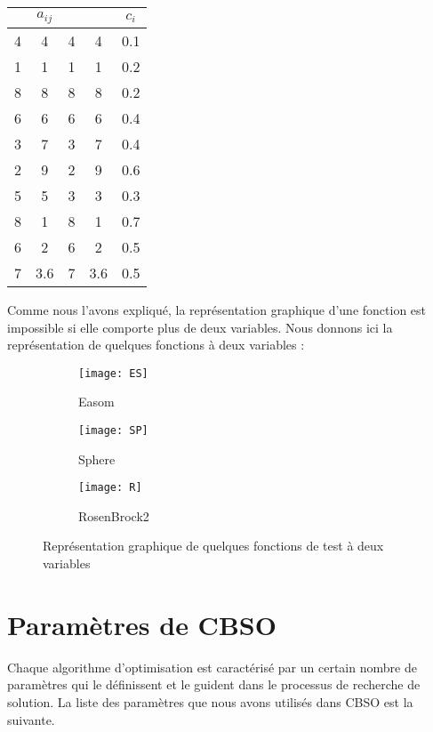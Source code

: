 \begin{itemize}
	\bigskip
	\bigskip
	
	\begin{table}[H]\centering
		\begin{tabular}{cccc|c}
			\toprule \textbf{} & \textbf{$a_{ij}$} & \textbf{} & \textbf{} & \textbf{$c_i$} \\    \midrule
			4 & 4 & 4 & 4 & 0.1  \\  
			1 & 1 & 1 & 1 & 0.2  \\ 
			8 & 8 & 8 & 8 & 0.2  \\
			6 & 6 & 6 & 6 & 0.4  \\ 
			3 & 7 & 3 & 7 & 0.4  \\ 
			2 & 9 & 2 & 9 & 0.6  \\ 
			5 & 5 & 3 & 3 & 0.3  \\ 
			8 & 1 & 8 & 1 & 0.7  \\ 
			6 & 2 & 6 & 2 & 0.5  \\ 
			7 & 3.6 & 7 & 3.6 & 0.5  \\ 
			\bottomrule	
		\end{tabular}
	\end{table}
	
\end{itemize}

\vspace{1.5em}

Comme nous l'avons expliqué, la représentation graphique d'une fonction est impossible si elle comporte plus de deux variables. Nous donnons ici la représentation de quelques fonctions à deux variables :

\begin{figure}[H]
	\centering
	\begin{subfigure}{0.3\textwidth}
		\texttt{[image: ES]}
		\caption{Easom}
	\end{subfigure}
	\begin{subfigure}{0.3\textwidth}
		\texttt{[image: SP]}
		\caption{Sphere}
	\end{subfigure}
	\begin{subfigure}{0.3\textwidth}
		\texttt{[image: R]}
		\caption{RosenBrock2}
	\end{subfigure}
	\caption{Représentation graphique de quelques fonctions de test à deux variables}
\end{figure}

\section{Paramètres de CBSO}
Chaque algorithme d'optimisation est caractérisé par un certain nombre de paramètres qui le définissent et le guident dans le processus de recherche de solution. La liste des paramètres que nous avons utilisés dans CBSO est la suivante.


